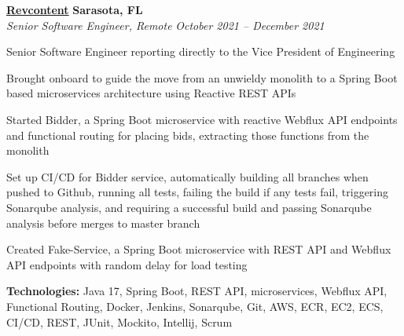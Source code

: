 %
    \headerrow
        {\textbf{\href{https://www.revcontent.com/}{Revcontent}}}
        {\textbf{Sarasota, FL}}
    \\
    \headerrow
        {\emph{Senior Software Engineer, Remote}}
        {\emph{October 2021 -- December 2021}}
    \begin{itemize*}
        \item Senior Software Engineer reporting directly to the Vice President of Engineering
        \item Brought onboard to guide the move from an unwieldy monolith to a Spring Boot based
            microservices architecture using Reactive REST APIs
        \item Started Bidder, a Spring Boot microservice with reactive Webflux API endpoints and functional
            routing for placing bids, extracting those functions from the monolith
        \item Set up CI/CD for Bidder service, automatically building all branches when pushed to Github,
            running all tests, failing the build if any tests fail, triggering Sonarqube analysis, and requiring
            a successful build and passing Sonarqube analysis before merges to master branch
        \item Created Fake-Service, a Spring Boot microservice with REST API and Webflux API endpoints with random
            delay for load testing
    \end{itemize*}

    \hspace{1.0em}
        {\textbf{Technologies:} Java 17, Spring Boot, REST API, microservices, Webflux API, Functional Routing,
        Docker, Jenkins, Sonarqube, Git, AWS, ECR, EC2, ECS, CI/CD, REST, JUnit, Mockito, Intellij, Scrum}

